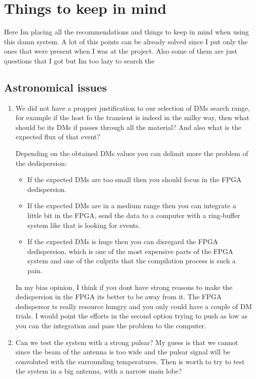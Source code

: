 \section{Things to keep in mind}

Here Im placing all the recommendations and things to keep in mind when using this damn system. A lot of this points can be already solved since I put only the ones that were present when I was at the project. Also some of them are just questions that I got but Im too lazy to search the 

\subsection{Astronomical issues}
\begin{enumerate}
    \item We did not have a propper justification to our selection of DMs search range, for example if the host fo the transient is indeed in the milky way, then what should be its DMs if passes through all the material? And also what is the expected flux of that event?

    Depending on the obtained DMs values you can delimit more the problem of the dedispersion:
    \begin{itemize}
        \item If the expected DMs are too small then you should focus in the FPGA dedispersion.
        \item If the expected DMs are in a medium range then you can integrate a little bit in the FPGA, send the data to a computer with a ring-buffer system like that is looking for events.
        \item If the expected DMs is huge then you can disregard the FPGA dedispersion, which is one of the most expensive parts of the FPGA system and one of the culprits that the compilation process is such a pain.
    \end{itemize}
        In my bias opinion, I think if you dont have strong reasons to make the dedispersion in the FPGA its better to be away from it. The FPGA dedispersor ts really resource hungry and you only could have a couple of DM trials. I would point the efforts in the second option trying to push as low as you can the integration and pass the problem to the computer.
        
    \item Can we test the system with a strong pulsar? My guess is that we cannot since the beam of the antenna is too wide and the pulsar signal will be convoluted with the surrounding temperatures. Then is worth to try to test the system in a big antenna, with a narrow main lobe?
\end{enumerate}

